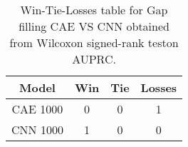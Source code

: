 \begin{table}[H]
\centering
\begin{tabular}{|c|c|c|c|}

\textbf{Model} &  \textbf{Win} &  \textbf{Tie} &  \textbf{Losses} \\
\hline

      CAE 1000 &             0 &             0 &                1 \\
\hline
      CNN 1000 &             1 &             0 &                0 \\
\hline

\end{tabular}
\caption{Win-Tie-Losses table for Gap filling CAE VS CNN obtained from Wilcoxon signed-rank teston AUPRC.}
\label{tab:gap_filling_cae_vs_cnn_model_comparison}
\end{table}